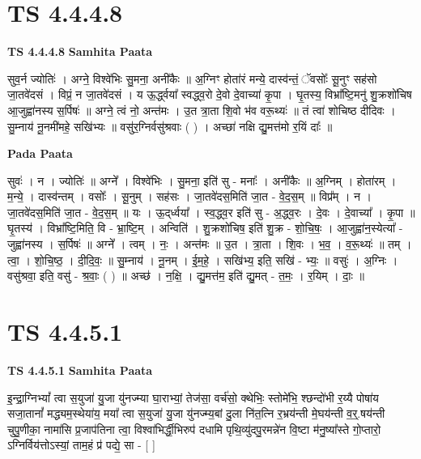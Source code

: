 \documentclass[17pt]{extarticle}
\begin{document}
\section{ TS 4.4.4.8 }

\textbf{TS 4.4.4.8 } \newline
\textbf{Samhita Paata} \newline

सुव॒र्न ज्योतिः॑ । अग्ने॒ विश्वे॑भिः सु॒मना॒ अनी॑कैः ॥ अ॒ग्निꣳ होता॑रं मन्ये॒ दास्व॑न्तं॒ ॅवसोः᳚ सू॒नुꣳ सह॑सो जा॒तवे॑दसं । विप्रं॒ न जा॒तवे॑दसं । य ऊ॒र्द्ध्वया᳚ स्वद्ध्व॒रो दे॒वो दे॒वाच्या॑ कृ॒पा । घृ॒तस्य॒ विभ्रा᳚ष्टि॒मनु॑ शु॒क्रशो॑चिष आ॒जुह्वा॑नस्य स॒र्पिषः॑ ॥ अग्ने॒ त्वं नो॒ अन्त॑मः । उ॒त त्रा॒ता शि॒वो भ॑व वरू॒थ्यः॑ ॥ तं त्वा॑ शोचिष्ठ दीदिवः । सु॒म्नाय॑ नू॒नमी॑महे॒ सखि॑भ्यः ॥ वसु॑र॒ग्निर्वसु॑श्रवाः ( ) । अच्छा॑ नक्षि द्यु॒मत्त॑मो र॒यिं दाः᳚ ॥ \newline

\textbf{Pada Paata} \newline

सुवः॑ । न । ज्योतिः॑ ॥ अग्ने᳚ । विश्वे॑भिः । सु॒मना॒ इति॑ सु - मनाः᳚ । अनी॑कैः ॥ अ॒ग्निम् । होता॑रम् । म॒न्ये॒ । दास्व॑न्तम् । वसोः᳚ । सू॒नुम् । सह॑सः । जा॒तवे॑दस॒मिति॑ जा॒त - वे॒द॒स॒म् ॥ विप्र᳚म् । न । जा॒तवे॑दस॒मिति॑ जा॒त - वे॒द॒स॒म् ॥ यः । ऊ॒द्‌र्ध्वया᳚ । स्व॒द्ध्व॒र इति॑ सु - अ॒द्ध्व॒रः । दे॒वः । दे॒वाच्या᳚ । कृ॒पा ॥ घृ॒तस्य॑ । विभ्रा᳚ष्टि॒मिति॒ वि - भ्रा॒ष्टि॒म् । अन्विति॑ । शु॒क्रशो॑चिष॒ इति॑ शु॒क्र - शो॒चि॒षः॒ । आ॒जुह्वा॑न॒स्येत्या᳚ - जुह्वा॑नस्य । स॒र्पिषः॑ ॥ अग्ने᳚ । त्वम् । नः॒ । अन्त॑मः ॥ उ॒त । त्रा॒ता । शि॒वः । भ॒व॒ । व॒रू॒थ्यः॑ ॥ तम् । त्वा॒ । शो॒चि॒ष्ठ॒ । दी॒दि॒वः॒ ॥ सु॒म्नाय॑ । नू॒नम् । ई॒म॒हे॒ । सखि॑भ्य॒ इति॒ सखि॑ - भ्यः॒ ॥ वसुः॑ । अ॒ग्निः । वसु॑श्रवा॒ इति॒ वसु॑ - श्र॒वाः॒ ( ) ॥ अच्छ॑ । न॒क्षि॒ । द्यु॒मत्त॑म॒ इति॑ द्यु॒मत् - त॒मः॒ । र॒यिम् । दाः॒ ॥  \newline





\section{ TS 4.4.5.1 }

\textbf{TS 4.4.5.1 } \newline
\textbf{Samhita Paata} \newline

इ॒न्द्रा॒ग्निभ्यां᳚ त्वा स॒युजा॑ यु॒जा यु॑नज्म्या घा॒राभ्यां॒ तेज॑सा॒ वर्च॑सो॒ क्थेभिः॒ स्तोमे॑भि॒ श्छन्दो॑भी र॒य्यै पोषा॑य सजा॒तानां᳚ मद्ध्यम॒स्थेया॑य॒ मया᳚ त्वा स॒युजा॑ यु॒जा यु॑नज्म्य॒बां दु॒ला नि॑त॒त्नि र॒भ्रय॑न्ती मे॒घय॑न्ती व॒र्॒.षय॑न्ती चुपु॒णीका॒ नामा॑सि प्र॒जाप॑तिना त्वा॒ विश्वा॑भिर्द्धी॒भिरुप॑ दधामि पृथि॒व्यु॑दपु॒रमन्ने॑न वि॒ष्टा म॑नु॒ष्या᳚स्ते गो॒प्तारो॒ ऽग्निर्विय॑त्तोऽस्यां॒ ताम॒हं प्र॑ पद्ये॒ सा - [  ] \newline
\end{document}

